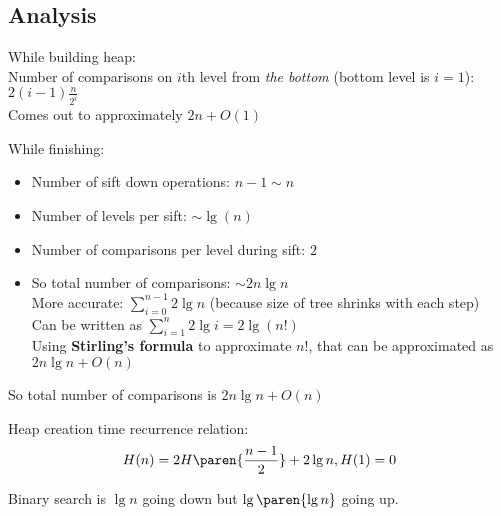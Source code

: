 \subsection*{Analysis}

While building heap:\\
Number of comparisons on $i$th level from \emph{the bottom} (bottom level is $i = 1$): $\displaystyle 2(i - 1)\frac{n}{2^i}$\\
Comes out to approximately $2n + O(1)$

While finishing:
\begin{itemize}
    \item Number of sift down operations: $n - 1 \sim n$
    \item Number of levels per sift: $\sim \lg(n)$
    \item Number of comparisons per level during sift: $2$
    \item So total number of comparisons: $\sim 2n\lg n$\\
    More accurate: $\displaystyle \sum_{i=0}^{n-1} 2\lg n$ (because size of tree shrinks with each step)\\
    Can be written as $\displaystyle \sum_{i=1}^n 2\lg i = 2\lg(n!)$\\
    Using \textbf{Stirling's formula} to approximate $n!$, that can be approximated as $2n\lg n + O(n)$
\end{itemize}

So total number of comparisons is $2n\lg n + O(n)$

Heap creation time recurrence relation:
\[H(n) = 2H\paren{\frac{n-1}{2}} + 2\lg n, H(1) = 0\]

Binary search is $\lg n$ going down but $\lg\paren{\lg n}$ going up.
